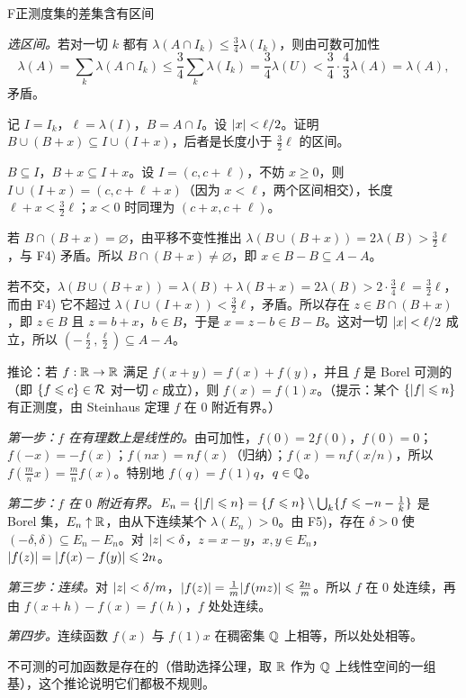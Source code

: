 \begin{probleme}{F}{正测度集的差集含有区间}
\begin{questions}
\begin{solution}
\emph{选区间。}若对一切 $k$ 都有 $\lambda(A\cap I_k)\leqslant\frac34\lambda(I_k)$，则由可数可加性
\[
\lambda(A)=\sum_k\lambda(A\cap I_k)\leqslant\frac34\sum_k\lambda(I_k)=\frac34\lambda(U)<\frac34\cdot\frac43\lambda(A)=\lambda(A),
\]
矛盾。
\end{solution}
\item 记 $I=I_k$，$\ell=\lambda(I)$，$B=A\cap I$。设 $\lvert x\rvert<\ell/2$。证明 $B\cup(B+x)\subseteq I\cup(I+x)$，后者是长度小于 $\frac32\ell$ 的区间。
\begin{solution}
$B\subseteq I$，$B+x\subseteq I+x$。设 $I=(c,c+\ell)$，不妨 $x\geqslant0$，则 $I\cup(I+x)=(c,c+\ell+x)$（因为 $x<\ell$，两个区间相交），长度 $\ell+x<\frac32\ell$；$x<0$ 时同理为 $(c+x,c+\ell)$。
\end{solution}
\item 若 $B\cap(B+x)=\varnothing$，由平移不变性推出 $\lambda(B\cup(B+x))=2\lambda(B)>\frac32\ell$，与 F4) 矛盾。所以 $B\cap(B+x)\neq\varnothing$，即 $x\in B-B\subseteq A-A$。
\begin{solution}
若不交，$\lambda(B\cup(B+x))=\lambda(B)+\lambda(B+x)=2\lambda(B)>2\cdot\frac34\ell=\frac32\ell$，而由 F4) 它不超过 $\lambda(I\cup(I+x))<\frac32\ell$，矛盾。所以存在 $z\in B\cap(B+x)$，即 $z\in B$ 且 $z=b+x$，$b\in B$，于是 $x=z-b\in B-B$。这对一切 $\lvert x\rvert<\ell/2$ 成立，所以 $(-\frac\ell2,\frac\ell2)\subseteq A-A$。
\end{solution}
\item 推论：若 $f:\mathbb{R}\to\mathbb{R}$ 满足 $f(x+y)=f(x)+f(y)$，并且 $f$ 是 Borel 可测的（即 $\{f\leqslant c\}\in\mathcal{R}$ 对一切 $c$ 成立），则 $f(x)=f(1)x$。（提示：某个 $\{\lvert f\rvert\leqslant n\}$ 有正测度，由 Steinhaus 定理 $f$ 在 $0$ 附近有界。）
\begin{solution}
\emph{第一步：$f$ 在有理数上是线性的。}由可加性，$f(0)=2f(0)$，$f(0)=0$；$f(-x)=-f(x)$；$f(nx)=nf(x)$（归纳）；$f(x)=nf(x/n)$，所以 $f(\frac mnx)=\frac mnf(x)$。特别地 $f(q)=f(1)q$，$q\in\mathbb{Q}$。

\emph{第二步：$f$ 在 $0$ 附近有界。}$E_n=\{\lvert f\rvert\leqslant n\}=\{f\leqslant n\}\setminus\bigcup_k\{f\leqslant-n-\frac1k\}$ 是 Borel 集，$E_n\uparrow\mathbb{R}$，由从下连续某个 $\lambda(E_n)>0$。由 F5)，存在 $\delta>0$ 使 $(-\delta,\delta)\subseteq E_n-E_n$。对 $\lvert z\rvert<\delta$，$z=x-y$，$x,y\in E_n$，$\lvert f(z)\rvert=\lvert f(x)-f(y)\rvert\leqslant2n$。

\emph{第三步：连续。}对 $\lvert z\rvert<\delta/m$，$\lvert f(z)\rvert=\frac1m\lvert f(mz)\rvert\leqslant\frac{2n}m$。所以 $f$ 在 $0$ 处连续，再由 $f(x+h)-f(x)=f(h)$，$f$ 处处连续。

\emph{第四步。}连续函数 $f(x)$ 与 $f(1)x$ 在稠密集 $\mathbb{Q}$ 上相等，所以处处相等。

不可测的可加函数是存在的（借助选择公理，取 $\mathbb{R}$ 作为 $\mathbb{Q}$ 上线性空间的一组基），这个推论说明它们都极不规则。
\end{solution}
\end{questions}
\end{probleme}
